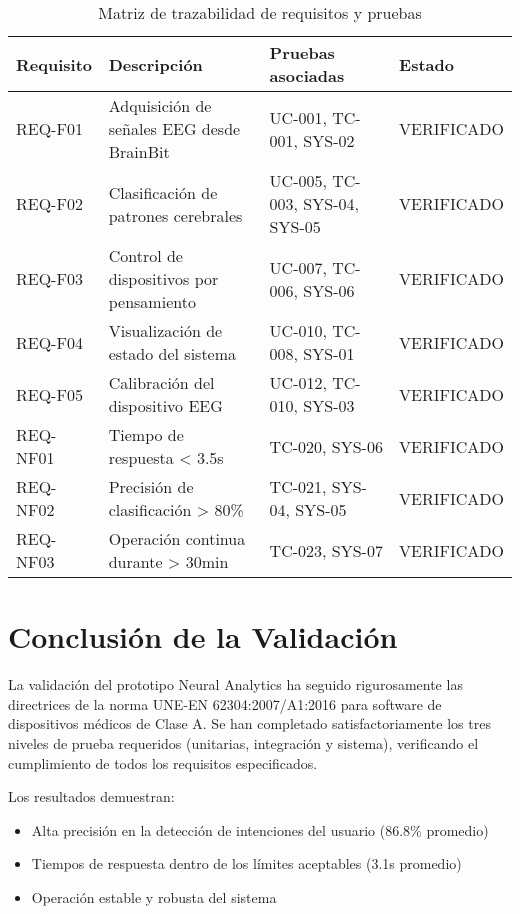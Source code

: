 \begin{table}[ht]
    \centering
    \begin{tabular}{|p{2cm}|p{5cm}|p{3cm}|p{3cm}|}
        \hline
        \textbf{Requisito} & \textbf{Descripción} & \textbf{Pruebas asociadas} & \textbf{Estado} \\
        \hline
        REQ-F01 & Adquisición de señales EEG desde BrainBit & UC-001, TC-001, SYS-02 & VERIFICADO \\
        \hline
        REQ-F02 & Clasificación de patrones cerebrales & UC-005, TC-003, SYS-04, SYS-05 & VERIFICADO \\
        \hline
        REQ-F03 & Control de dispositivos por pensamiento & UC-007, TC-006, SYS-06 & VERIFICADO \\
        \hline
        REQ-F04 & Visualización de estado del sistema & UC-010, TC-008, SYS-01 & VERIFICADO \\
        \hline
        REQ-F05 & Calibración del dispositivo EEG & UC-012, TC-010, SYS-03 & VERIFICADO \\
        \hline
        REQ-NF01 & Tiempo de respuesta < 3.5s & TC-020, SYS-06 & VERIFICADO \\
        \hline
        REQ-NF02 & Precisión de clasificación > 80\% & TC-021, SYS-04, SYS-05 & VERIFICADO \\
        \hline
        REQ-NF03 & Operación continua durante > 30min & TC-023, SYS-07 & VERIFICADO \\
        \hline
    \end{tabular}
    \caption{Matriz de trazabilidad de requisitos y pruebas}
    \label{tab:traceability}
\end{table}

\section{Conclusión de la Validación}

La validación del prototipo Neural Analytics ha seguido rigurosamente las directrices de la norma UNE-EN 62304:2007/A1:2016 para software de dispositivos médicos de Clase A. Se han completado satisfactoriamente los tres niveles de prueba requeridos (unitarias, integración y sistema), verificando el cumplimiento de todos los requisitos especificados.

Los resultados demuestran:

\begin{itemize}
    \item Alta precisión en la detección de intenciones del usuario (86.8\% promedio)
    \item Tiempos de respuesta dentro de los límites aceptables (3.1s promedio)
    \item Operación estable y robusta del sistema
\end{itemize}

